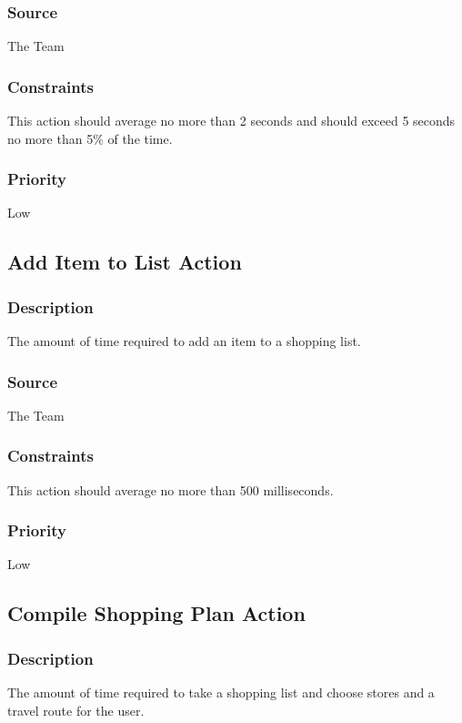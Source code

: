 \subsubsection{Source}
The Team
\subsubsection{Constraints}
This action should average no more than 2 seconds and should exceed 5 seconds no more than 5\% of the time.
\subsubsection{Priority}
Low

\subsection{Add Item to List Action}
\subsubsection{Description}
The amount of time required to add an item to a shopping list.
\subsubsection{Source}
The Team
\subsubsection{Constraints}
This action should average no more than 500 milliseconds.
\subsubsection{Priority}
Low

\subsection{Compile Shopping Plan Action}
\subsubsection{Description}
The amount of time required to take a shopping list and choose stores and a travel route for the user.

